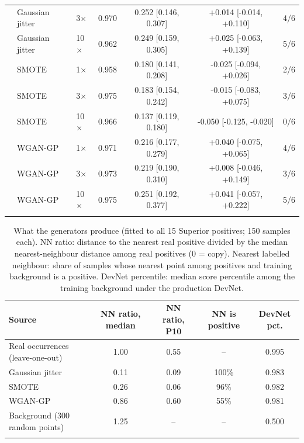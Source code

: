 \documentclass[pdflatex,sn-apa]{sn-jnl}
\begin{document}
\begin{table}[t]
\begin{tabular*}{\textwidth}{@{\extracolsep\fill}lllcccc}
 & Gaussian jitter & 3$\times$ & 0.970 & 0.252 [0.146, 0.307] & +0.014 [-0.014, +0.110] & 4/6 \\
 & Gaussian jitter & 10$\times$ & 0.962 & 0.249 [0.159, 0.305] & +0.025 [-0.063, +0.139] & 5/6 \\
 & SMOTE & 1$\times$ & 0.958 & 0.180 [0.141, 0.208] & -0.025 [-0.094, +0.026] & 2/6 \\
 & SMOTE & 3$\times$ & 0.975 & 0.183 [0.154, 0.242] & -0.015 [-0.083, +0.075] & 3/6 \\
 & SMOTE & 10$\times$ & 0.966 & 0.137 [0.119, 0.180] & -0.050 [-0.125, -0.020] & 0/6 \\
 & WGAN-GP & 1$\times$ & 0.971 & 0.216 [0.177, 0.279] & +0.040 [-0.075, +0.065] & 4/6 \\
 & WGAN-GP & 3$\times$ & 0.973 & 0.219 [0.190, 0.310] & +0.008 [-0.046, +0.149] & 3/6 \\
 & WGAN-GP & 10$\times$ & 0.975 & 0.251 [0.192, 0.377] & +0.041 [-0.057, +0.222] & 5/6 \\
\botrule
\end{tabular*}
\end{table}

\begin{table}[t]
\caption{What the generators produce (fitted to all 15 Superior positives; 150 samples each). NN ratio: distance to the nearest real positive divided by the median nearest-neighbour distance among real positives (0 = copy). Nearest labelled neighbour: share of samples whose nearest point among positives and training background is a positive. DevNet percentile: median score percentile among the training background under the production DevNet.}\label{tab:aug-diag}
\footnotesize
\setlength{\tabcolsep}{2.5pt}
\begin{tabular*}{\textwidth}{@{\extracolsep\fill}lcccc}
\toprule
Source & NN ratio, median & NN ratio, P10 & NN is positive & DevNet pct. \\
\midrule
Real occurrences (leave-one-out) & 1.00 & 0.55 & -- & 0.995 \\
Gaussian jitter & 0.11 & 0.09 & 100\% & 0.983 \\
SMOTE & 0.26 & 0.06 & 96\% & 0.982 \\
WGAN-GP & 0.86 & 0.60 & 55\% & 0.981 \\
Background (300 random points) & 1.25 & -- & -- & 0.500 \\
\botrule
\end{tabular*}
\end{table}
\end{document}
